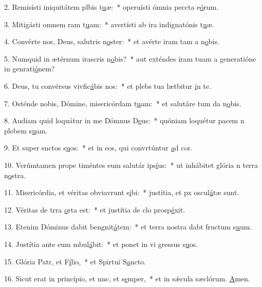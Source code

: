 2. Remisísti iniquitátem plbis t\uline{u}æ:~* operuísti ómnia peccta e\uline{ó}rum.\par 
3. Mitigásti omnem ram t\uline{u}am:~* avertísti ab ira indignatónis t\uline{u}æ.\par 
4. Convérte nos, Deus, salutris n\uline{o}ster:~* et avérte iram tam a n\uline{o}bis.\par 
5. Numquid in ætérnum irascris n\uline{o}bis?~* aut exténdes iram tuam a generatióne in genrati\uline{ó}nem?\par 
6. Deus, tu convérsus vivfic\uline{á}bis nos:~* et plebs tua lætbitur \uline{i}n te.\par 
7. Osténde nobis, Dómine, misericórdam t\uline{u}am:~* et salutáre tum da n\uline{o}bis.\par 
8. Audiam quid loquátur in me Dómnus D\uline{e}us:~* quóniam loquétur pacem n plebem s\uline{u}am.\par 
9. Et super snctos s\uline{u}os:~* et in eos, qui convrtúntur \uline{a}d cor.\par 
10. Verúmtamen prope timéntes eum salutár ips\uline{í}us:~* ut inhábitet glória n terra n\uline{o}stra.\par 
11. Misericórdia, et véritas obviavrunt s\uline{i}bi:~* justítia, et px oscul\uline{á}tæ sunt.\par 
12. Véritas de trra \uline{o}rta est:~* et justítia de clo prosp\uline{é}xit.\par 
13. Etenim Dóminus dabit bengnit\uline{á}tem:~* et terra nostra dabt fructum s\uline{u}um.\par 
14. Justítia ante eum mbul\uline{á}bit:~* et ponet in vi gressus s\uline{u}os.\par 
15. Glória Patr, et F\uline{í}lio,~* et Spirtui S\uline{a}ncto.\par 
16. Sicut erat in princípio, et nnc, et s\uline{e}mper,~* et in sǽcula sæclórum. \uline{A}men.\par 

